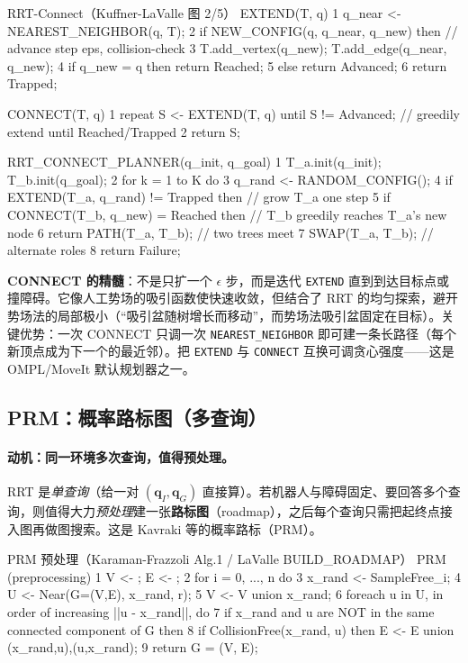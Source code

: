 \begin{codebox}[text]{RRT-Connect（Kuffner-LaValle 图 2/5）}
EXTEND(T, q)
 1  q_near <- NEAREST_NEIGHBOR(q, T);
 2  if NEW_CONFIG(q, q_near, q_new) then    // advance step eps, collision-check
 3      T.add_vertex(q_new); T.add_edge(q_near, q_new);
 4      if q_new = q then return Reached;
 5      else return Advanced;
 6  return Trapped;

CONNECT(T, q)
 1  repeat S <- EXTEND(T, q) until S != Advanced;   // greedily extend until Reached/Trapped
 2  return S;

RRT_CONNECT_PLANNER(q_init, q_goal)
 1  T_a.init(q_init);  T_b.init(q_goal);
 2  for k = 1 to K do
 3      q_rand <- RANDOM_CONFIG();
 4      if EXTEND(T_a, q_rand) != Trapped then        // grow T_a one step
 5          if CONNECT(T_b, q_new) = Reached then       // T_b greedily reaches T_a's new node
 6              return PATH(T_a, T_b);                   // two trees meet
 7      SWAP(T_a, T_b);                                  // alternate roles
 8  return Failure;
\end{codebox}

\noindent\textbf{CONNECT 的精髓}：不是只扩一个 $\epsilon$ 步，而是迭代 \texttt{EXTEND} 直到到达目标点或撞障碍。它像人工势场的吸引函数使快速收敛，但结合了 RRT 的均匀探索，避开势场法的局部极小（“吸引盆随树增长而移动”，而势场法吸引盆固定在目标）。关键优势：一次 CONNECT 只调一次 \texttt{NEAREST\_NEIGHBOR} 即可建一条长路径（每个新顶点成为下一个的最近邻）。把 \texttt{EXTEND} 与 \texttt{CONNECT} 互换可调贪心强度——这是 OMPL/MoveIt 默认规划器之一。

\subsection{PRM：概率路标图（多查询）}
\label{sec:plan-prm}

\paragraph{动机：同一环境多次查询，值得预处理。}
RRT 是\emph{单查询}（给一对 $(\mathbf{q}_I,\mathbf{q}_G)$ 直接算）。若机器人与障碍固定、要回答多个查询，则值得大力\emph{预处理}建一张\textbf{路标图}（roadmap），之后每个查询只需把起终点接入图再做图搜索。这是 Kavraki 等的概率路标（PRM）。

\begin{codebox}[text]{PRM 预处理（Karaman-Frazzoli Alg.1 / LaValle BUILD_ROADMAP）}
PRM (preprocessing)
 1  V <- {};  E <- {};
 2  for i = 0, ..., n do
 3      x_rand <- SampleFree_i;
 4      U <- Near(G=(V,E), x_rand, r);
 5      V <- V union {x_rand};
 6      foreach u in U, in order of increasing ||u - x_rand||, do
 7          if x_rand and u are NOT in the same connected component of G then
 8              if CollisionFree(x_rand, u) then E <- E union {(x_rand,u),(u,x_rand)};
 9  return G = (V, E);
\end{codebox}

